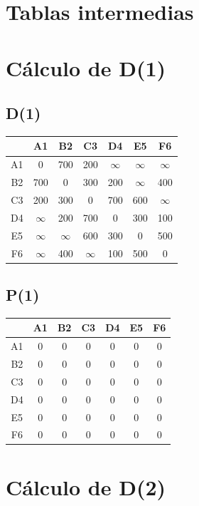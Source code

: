 \documentclass[a4paper,11pt]{article}
\begin{document}
\section*{Tablas intermedias}
\section*{Cálculo de D(1)}
\subsection*{D(1)}
\begin{center}
\begin{tabular}{c|cccccc}
 & A1 & B2 & C3 & D4 & E5 & F6 \\ \hline
A1 & 0 & 700 & 200 & $\infty$ & $\infty$ & $\infty$ \\
B2 & 700 & 0 & 300 & 200 & $\infty$ & 400 \\
C3 & 200 & 300 & 0 & 700 & 600 & $\infty$ \\
D4 & $\infty$ & 200 & 700 & 0 & 300 & 100 \\
E5 & $\infty$ & $\infty$ & 600 & 300 & 0 & 500 \\
F6 & $\infty$ & 400 & $\infty$ & 100 & 500 & 0 \\
\end{tabular}
\end{center}
\subsection*{P(1)}
\begin{center}
\begin{tabular}{c|cccccc}
 & A1 & B2 & C3 & D4 & E5 & F6 \\ \hline
A1 & 0 & 0 & 0 & 0 & 0 & 0 \\
B2 & 0 & 0 & 0 & 0 & 0 & 0 \\
C3 & 0 & 0 & 0 & 0 & 0 & 0 \\
D4 & 0 & 0 & 0 & 0 & 0 & 0 \\
E5 & 0 & 0 & 0 & 0 & 0 & 0 \\
F6 & 0 & 0 & 0 & 0 & 0 & 0 \\
\end{tabular}
\end{center}
\newpage
\section*{Cálculo de D(2)}
\end{document}
